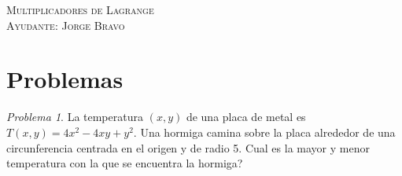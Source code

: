\documentclass[a4paper,oneside,10.5pt]{article}
\theoremstyle{definition}
\theoremstyle{plain}
\theoremstyle{remark}
\theoremstyle{theorem}
\newtheorem{prob}{Problema}
\begin{document}
\begin{center}
{\Large \textsc{Multiplicadores de Lagrange}}\\
\vspace{1em}
\textsc{Ayudante: Jorge Bravo}\\
\end{center}

\section*{Problemas}
\begin{prob}
    La temperatura $(x, y)$ de una placa de metal es $T(x, y) = 4x^2 - 4xy + y^2$. Una hormiga camina sobre la placa alrededor de una circunferencia centrada en el origen y de radio 5. Cual es la mayor y menor temperatura con la que se encuentra la hormiga?
\end{prob}
\end{document}

